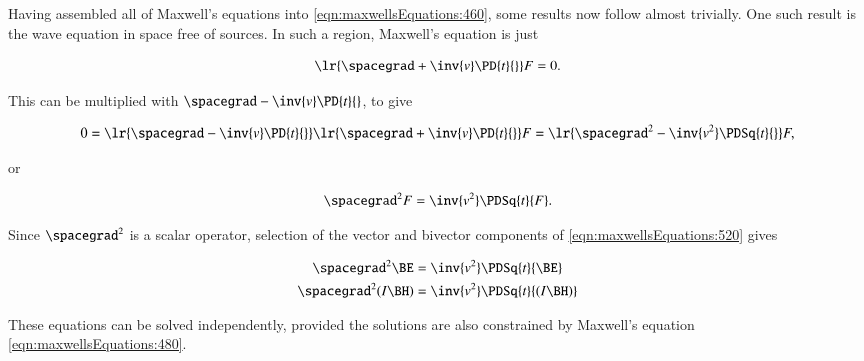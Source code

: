 %
%
Having assembled all of Maxwell's equations into \cref{eqn:maxwellsEquations:460}, some results now follow almost trivially.
One such result is the wave equation in space free of sources.
In such a region, Maxwell's equation is just

\begin{dmath}\label{eqn:maxwellsEquations:480}
\lr{ \spacegrad + \inv{v} \PD{t}{} } F = 0.
\end{dmath}

This can be multiplied with \( \spacegrad - \inv{v} \PD{t}{} \), to give

\begin{dmath}\label{eqn:maxwellsEquations:500}
0 =
\lr{ \spacegrad - \inv{v} \PD{t}{} }
\lr{ \spacegrad + \inv{v} \PD{t}{} } F
=
\lr{ \spacegrad^2 - \inv{v^2} \PDSq{t}{} } F,
\end{dmath}

or

\begin{dmath}\label{eqn:maxwellsEquations:520}
\spacegrad^2 F = \inv{v^2} \PDSq{t}{F}.
\end{dmath}

Since \( \spacegrad^2 \) is a scalar operator, selection of the vector and bivector components of \cref{eqn:maxwellsEquations:520} gives

\begin{dmath}\label{eqn:maxwellsEquations:540}
\begin{aligned}
\spacegrad^2 \BE &= \inv{v^2} \PDSq{t}{\BE} \\
\spacegrad^2 (I \BH) &= \inv{v^2} \PDSq{t}{(I \BH)} \\
\end{aligned}
\end{dmath}

These equations can be solved independently, provided the solutions are also constrained by Maxwell's equation \cref{eqn:maxwellsEquations:480}.

